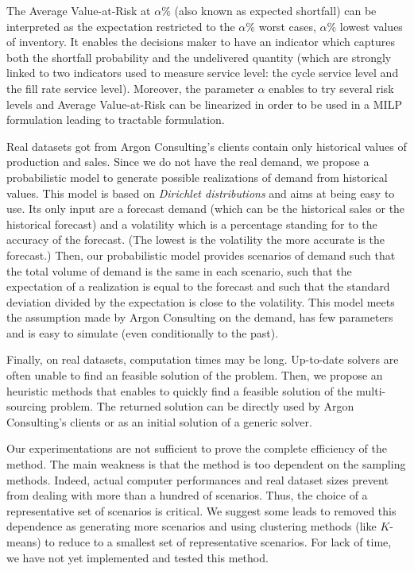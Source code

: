 The Average Value-at-Risk at $\alpha\%$ (also known as expected shortfall) can be interpreted as the expectation restricted to the $\alpha\%$ worst cases, \ie $\alpha\%$ lowest values of inventory.
It enables the decisions maker to have an indicator which captures both the shortfall probability and the undelivered quantity (which are strongly linked to two indicators used to measure service level: the cycle service level and the fill rate service level).
Moreover, the parameter $\alpha$ enables to try several risk levels and Average Value-at-Risk can be linearized in order to be used in a MILP formulation leading to tractable formulation.


\medskip


Real datasets got from Argon Consulting's clients contain only historical values of production and sales.
Since we do not have the real demand, we propose a probabilistic model to generate possible realizations of demand from historical values.
This model is based on \emph{Dirichlet distributions} and aims at being easy to use.
Its only input are a forecast demand (which can be the historical sales or the historical forecast) and a volatility which is a percentage standing for to the accuracy of the forecast.
(The lowest is the volatility the more accurate is the forecast.)
Then, our probabilistic model provides scenarios of demand such that the total volume of demand is the same in each scenario, such that the expectation of a realization is equal to the forecast and such that the standard deviation divided by the expectation is close to the volatility.
This model meets the assumption made by Argon Consulting on the demand, has few parameters and is easy to simulate (even conditionally to the past).


\medskip


Finally, on real datasets, computation times may be long.
Up-to-date solvers are often unable to find an feasible solution of the problem.
Then, we propose an heuristic methods that enables to quickly find a feasible solution of the multi-sourcing problem.
The returned solution can be directly used by Argon Consulting's clients or as an initial solution of a generic solver.


\medskip


Our experimentations are not sufficient to prove the complete efficiency of the method.
The main weakness is that the method is too dependent on the sampling methods.
Indeed, actual computer performances and real dataset sizes prevent from dealing with more than a hundred of scenarios.
Thus, the choice of a representative set of scenarios is critical.
We suggest some leads to removed this dependence as generating more scenarios and using clustering methods (like $K$-means) to reduce to a smallest set of representative scenarios.
For lack of time, we have not yet implemented and tested this method.



